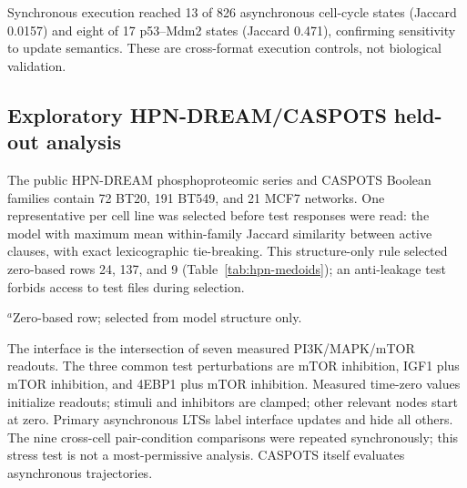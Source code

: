 \documentclass{ws-jbcb}
\numberwithin{equation}{section}
\begin{document}
Synchronous execution reached 13 of 826 asynchronous cell-cycle states (Jaccard
0.0157) and eight of 17 p53--Mdm2 states (Jaccard 0.471), confirming sensitivity
to update semantics. These are cross-format execution controls, not biological
validation.

\subsection{Exploratory HPN-DREAM/CASPOTS held-out analysis}\label{sec:hpn-method}

The public HPN-DREAM phosphoproteomic series and CASPOTS Boolean families contain
72 BT20, 191 BT549, and 21 MCF7 networks.\cite{Hill2016,Razzaq2018} One
representative per cell line was selected before test responses were read: the
model with maximum mean within-family Jaccard similarity between active clauses,
with exact lexicographic tie-breaking. This structure-only rule selected
zero-based rows 24, 137, and 9 (Table~\ref{tab:hpn-medoids}); an anti-leakage test
forbids access to test files during selection.

\begin{table}[t]
\begin{tabnote}$^a$Zero-based row; selected from model structure only.\end{tabnote}
\end{table}

The interface is the intersection of seven measured PI3K/MAPK/mTOR readouts.
The three common test perturbations are mTOR inhibition, IGF1 plus mTOR
inhibition, and 4EBP1 plus mTOR inhibition. Measured time-zero values initialize
readouts; stimuli and inhibitors are clamped; other relevant nodes start at zero.
Primary asynchronous LTSs label interface updates and hide all others. The nine
cross-cell pair-condition comparisons were repeated synchronously; this stress
test is not a most-permissive analysis. CASPOTS itself evaluates asynchronous
trajectories.\cite{Pauleve2020,Razzaq2018}
\end{document}
